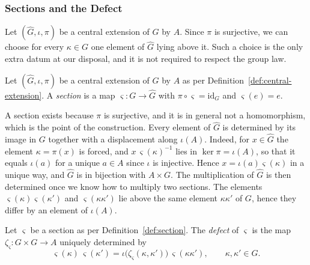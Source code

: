 \subsubsection*{Sections and the Defect}

Let $(\widehat{G},\iota,\pi)$ be a central extension of $G$ by $A$. Since $\pi$ is surjective, we can choose for every $\kappa\in G$ one element of $\widehat{G}$ lying above it. Such a choice is the only extra datum at our disposal, and it is not required to respect the group law.

\begin{definition}[Section]\label{def:section}
	Let $(\widehat{G},\iota,\pi)$ be a central extension of $G$ by $A$ as per Definition~\ref{def:central-extension}. A \emph{section} is a map $\varsigma:G\to\widehat{G}$ with $\pi\circ\varsigma=\mathrm{id}_G$ and $\varsigma(e)=e$.
\end{definition}

A section exists because $\pi$ is surjective, and it is in general not a homomorphism, which is the point of the construction. Every element of $\widehat{G}$ is determined by its image in $G$ together with a displacement along $\iota(A)$. Indeed, for $x\in\widehat{G}$ the element $\kappa=\pi(x)$ is forced, and $x\,\varsigma(\kappa)^{-1}$ lies in $\ker\pi=\iota(A)$, so that it equals $\iota(a)$ for a unique $a\in A$ since $\iota$ is injective. Hence $x=\iota(a)\varsigma(\kappa)$ in a unique way, and $\widehat{G}$ is in bijection with $A\times G$. The multiplication of $\widehat{G}$ is then determined once we know how to multiply two sections. The elements $\varsigma(\kappa)\varsigma(\kappa')$ and $\varsigma(\kappa\kappa')$ lie above the same element $\kappa\kappa'$ of $G$, hence they differ by an element of $\iota(A)$.

\begin{definition}\label{def:defect}
	Let $\varsigma$ be a section as per Definition~\ref{def:section}. The \emph{defect} of $\varsigma$ is the map $\zeta_\varsigma:G\times G\to A$ uniquely determined by
	\begin{equation}\label{eq:defect}
		\varsigma(\kappa)\,\varsigma(\kappa')=\iota\big(\zeta_\varsigma(\kappa,\kappa')\big)\,\varsigma(\kappa\kappa'), \qquad \kappa,\kappa'\in G.
	\end{equation}
\end{definition}

